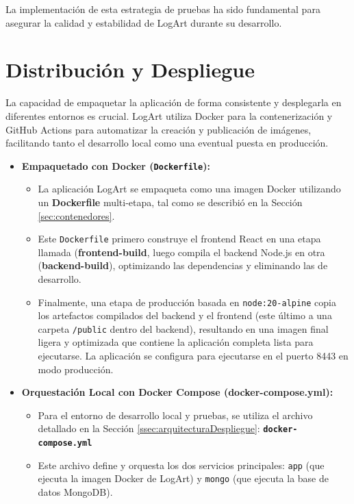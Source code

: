   La implementación de esta estrategia de pruebas ha sido fundamental para asegurar la calidad y estabilidad de LogArt durante su desarrollo.

\section{Distribución y Despliegue}
\label{sec:distribucionDespliegueCap4}

La capacidad de empaquetar la aplicación de forma consistente y desplegarla en diferentes entornos es crucial. LogArt utiliza Docker para la contenerización y GitHub Actions para automatizar la creación y publicación de imágenes, facilitando tanto el desarrollo local como una eventual puesta en producción.

\begin{itemize}
    \item \textbf{Empaquetado con Docker (\texttt{Dockerfile}):}
    \begin{itemize}
        \item La aplicación LogArt se empaqueta como una imagen Docker utilizando un \textbf{Dockerfile} multi-etapa, tal como se describió en la Sección \ref{sec:contenedores}.
        \item Este \texttt{Dockerfile} primero construye el frontend React en una etapa llamada (\textbf{frontend-build}, luego compila el backend Node.js en otra (\textbf{backend-build}), optimizando las dependencias y eliminando las de desarrollo.
        \item Finalmente, una etapa de producción basada en \texttt{node:20-alpine} copia los artefactos compilados del backend y el frontend (este último a una carpeta \texttt{/public} dentro del backend), resultando en una imagen final ligera y optimizada que contiene la aplicación completa lista para ejecutarse. La aplicación se configura para ejecutarse en el puerto 8443 en modo producción.
    \end{itemize}
    \vspace{0.3cm}
    \item \textbf{Orquestación Local con Docker Compose (\textbf{docker-compose.yml}):}
    \begin{itemize}
        \item Para el entorno de desarrollo local y pruebas, se utiliza el archivo detallado en la Sección \ref{ssec:arquitecturaDespliegue}: \textbf{\texttt{docker-compose.yml}} 
        \item Este archivo define y orquesta los dos servicios principales: \texttt{app} (que ejecuta la imagen Docker de LogArt) y \texttt{mongo} (que ejecuta la base de datos MongoDB).

\end{itemize}
\end{itemize}
